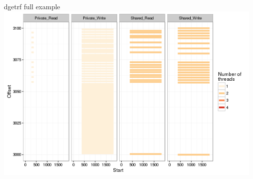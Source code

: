 \documentclass[xcolor={usenames,dvipsnames},hyperref={pdfusetitle}]{beamer}
\begin{document}
\begin{frame}{dgetrf full example}
{{{            }{
                \includegraphics[width=\textwidth]{labbook-slides/intensity_Share_dgetrf_zoom-init1}
            }
        }
    }
    \pause
    \pause
    \pause
\end{frame}%
\end{document}
